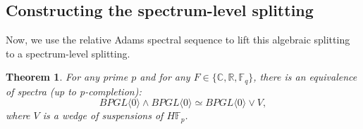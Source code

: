 \documentclass{amsart}
\newtheorem{theorem}{Theorem}[section]
\theoremstyle{plain}
\numberwithin{theorem}{section}
\numberwithin{equation}{section}
\numberwithin{figure}{section}
\newcommand{\0}{\langle 0 \rangle }
\begin{document}
\subsection{Constructing the spectrum-level splitting} \label{subsec:BPGL0relASS}

Now, we use the relative Adams spectral sequence to lift this algebraic splitting to a spectrum-level splitting.

\begin{theorem}
\label{thm:bpgl0coopalgebra}
    For any prime $p$ and for any $F \in \{\mathbb{C}, \mathbb{R}, \mathbb{F}_q\}$, there is an equivalence of spectra (up to p-completion):
    \[BPGL \langle 0 \rangle \wedge BPGL \langle 0 \rangle \simeq BPGL \langle 0 \rangle \vee V,\]
    where $V$ is a wedge of suspensions of $H\mathbb{F}_p$.
\end{theorem}
\end{document}
